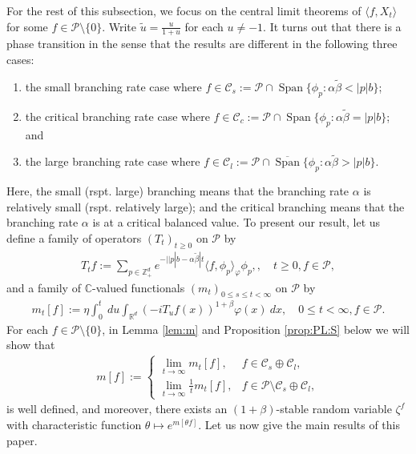 \documentclass[12pt,a4paper]{amsart}
\theoremstyle{plain}
\theoremstyle{definition}
\numberwithin{equation}{section}
\begin{document}
For the rest of this subsection, we focus on the central limit theorems of $\langle f, X_t\rangle$ for some $f\in \mathcal P\setminus \{0\}$.
Write $\tilde u = \frac{u}{ 1+ u}$ for each $u \neq -1$.
It turns out that there is a phase transition in the sense that the results are different in the following three cases:
\begin{enumerate}
\item
  the small branching rate case where $f \in \mathcal C_s := \mathcal P \cap \operatorname{Span} \{ \phi_p: \alpha \tilde \beta < |p| b \}$;
\item
  the critical branching rate case where $f \in \mathcal C_c   := \mathcal P \cap \operatorname{Span} \{ \phi_p : \alpha \tilde \beta = |p| b \} $; and
\item
  the large branching rate case  where $f \in \mathcal C_l   := \mathcal P \cap \overline{\operatorname{Span}} \{ \phi_p: \alpha \tilde \beta > |p| b \}$.
\end{enumerate}
Here, the small (rspt. large) branching means that the branching rate $\alpha$ is relatively small (rspt. relatively large); and the critical branching means that the branching rate $\alpha$ is at a critical balanced value.
To present our result, let us define a family of operators $(T_t)_{t\geq 0}$ on $\mathcal P$ by
\begin{align}
  \label{eq:I:R:1}
  T_t f
  := \sum_{p \in \mathbb Z_+^d} e^{-| |p|b - \alpha \tilde \beta |t} \langle f, \phi_p \rangle_{\varphi} \phi_p,
  ,\quad t\geq 0, f\in \mathcal P,
\end{align}
and a family of $\mathbb C$-valued functionals $(m_t)_{0 \leq s \leq t < \infty}$ on $\mathcal P$ by
\begin{align}
  \label{eq:I:R:2}
  m_t[f]
  := \eta \int_0^t ~du \int_{\mathbb R^d} (-iT_u f(x))^{1+\beta} \varphi(x) ~dx
  , \quad 0 \leq t< \infty, f\in \mathcal P.
\end{align}
For each $f\in \mathcal P\setminus \{0\}$, in Lemma \ref{lem:m} and Proposition \ref{prop:PL:S} below we will show that
\begin{align}
  \label{eq:I:R:3}
  m[f]
  := \begin{cases}
    \lim_{t\to \infty} m_t[f], &
    f \in \mathcal C_s \oplus \mathcal C_l, \\
    \lim_{t\to \infty} \frac{1}{t} m_t[f], & f\in \mathcal P \setminus \mathcal C_s \oplus \mathcal C_l,
  \end{cases}
\end{align}
is well defined, and moreover, there exists an $(1+\beta)$-stable random variable $\zeta^f$ with characteristic function $\theta \mapsto e^{m[\theta f]}$.
Let us now give the main results of this paper.
\end{document}
